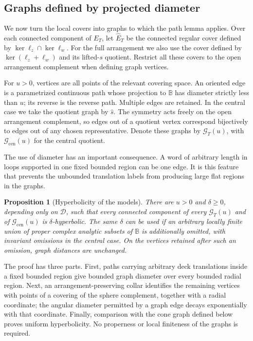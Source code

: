\documentclass[11pt,reqno]{amsart}
\numberwithin{equation}{section}
\newtheorem{proposition}[theorem]{Proposition}
\theoremstyle{definition}
\theoremstyle{remark}
\newcommand{\BB}{\mathbb B}
\newcommand{\cD}{\mathcal D}
\begin{document}
\subsection{Graphs defined by projected diameter}

We now turn the local covers into graphs to which the path lemma
applies.  Over each connected component of $E_T$, let
$\widehat E_T$ be the connected regular cover defined by
$\ker\ell_z\cap\ker\ell_w$.  For the full arrangement we also use
the cover defined by $\ker(\ell_z+\ell_w)$ and its lifted-$s$
quotient.  Restrict all these covers to the open arrangement
complement when defining graph vertices.

For $u>0$, vertices are all points of the relevant covering space.
An oriented edge is a parametrized continuous path whose projection
to $\BB$ has diameter strictly less than $u$; its reverse is the
reverse path.  Multiple edges are retained.  In the central case
we take the quotient graph by $\widehat s$.  The symmetry acts
freely on the open arrangement complement, so edges out of a
quotient vertex correspond bijectively to edges out of any chosen
representative.  Denote these graphs by $\mathcal G_T(u)$, with
$\mathcal G_{\mathrm{cen}}(u)$ for the central quotient.

The use of diameter has an important consequence.  A word of
arbitrary length in loops supported in one fixed bounded region
can be one edge.  It is this feature that prevents the unbounded
translation labels from producing large flat regions in the
graphs.

\begin{proposition}[Hyperbolicity of the models]\label{prop:model-hyperbolicity}
There are $u>0$ and $\delta\ge0$, depending only on $\cD$, such that
every connected component of every $\mathcal G_T(u)$ and of
$\mathcal G_{\mathrm{cen}}(u)$ is $\delta$-hyperbolic.
The same $\delta$ can be used if an arbitrary locally finite union
of proper complex analytic subsets of $\BB$ is additionally
omitted, with invariant omissions in the central case.  On the
vertices retained after such an omission, graph distances are
unchanged.
\end{proposition}

The proof has three parts.  First, paths carrying arbitrary deck
translations inside a fixed bounded region give bounded graph diameter
over every bounded radial region.  Next, an arrangement-preserving
collar identifies the remaining vertices with points of a covering of
the sphere complement, together with a radial coordinate; the angular
diameter permitted by a graph edge decays exponentially with that
coordinate.  Finally, comparison with the cone graph defined below
proves uniform hyperbolicity.  No properness or local finiteness of the
graphs is required.
\end{document}
